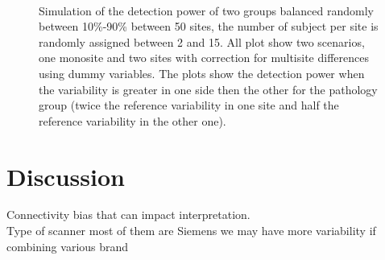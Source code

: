 \documentclass[authoryear]{elsarticle}
\begin{document}
\begin{figure}[tbp]
   \centering
    \captionsetup[subfloat]{labelformat=empty}
     \\
     \caption{
     Simulation of the detection power of two groups balanced randomly between 10\%-90\% between 50 sites, the number of subject per site is randomly assigned between 2 and 15. All plot show two scenarios, one monosite and two sites with correction for multisite differences using dummy variables. The plots show the detection power when the variability is greater in one side then the other for the pathology group (twice the reference variability in one site and half the reference variability in the other one).
}
     \label{fig_full_sim_50sites_rnd_debalancing}
\end{figure}

\section{Discussion}

Connectivity bias that can impact interpretation.\\

Type of scanner most of them are Siemens we may have more variability if combining various brand\\
\end{document}
